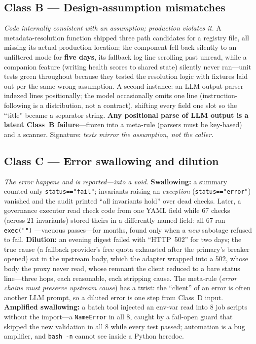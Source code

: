 \documentclass[conference]{IEEEtran}
\begin{document}
\subsection{Class B --- Design-assumption mismatches}
\emph{Code internally consistent with an assumption; production violates
it.} A metadata-resolution function shipped three path candidates for a
registry file, all missing its actual production location; the component
fell back silently to an unfiltered mode for \textbf{five days}, its
fallback log line scrolling past unread, while a companion feature
(writing health scores to shared state) silently never ran---unit tests
green throughout because they tested the resolution logic with fixtures
laid out per the same wrong assumption. A second instance: an LLM-output
parser indexed lines positionally; the model occasionally omits one line
(instruction-following is a distribution, not a contract), shifting every
field one slot so the ``title'' became a separator string. \textbf{Any
positional parse of LLM output is a latent Class~B failure}---frozen into
a meta-rule (parsers must be key-based) and a scanner. Signature:
\emph{tests mirror the assumption, not the caller.}

\subsection{Class C --- Error swallowing and dilution}
\emph{The error happens and is reported---into a void.} \textbf{Swallowing:}
a summary counted only \texttt{status=="fail"}; invariants raising an
\emph{exception} (\texttt{status=="error"}) vanished and the audit printed
``all invariants hold'' over dead checks. Later, a governance executor
read check code from one YAML field while 67 checks (across 21 invariants)
stored theirs in a differently named field: all 67 ran \texttt{exec("")}
---vacuous passes---for months, found only when a \emph{new} sabotage
refused to fail. \textbf{Dilution:} an evening digest failed with
``HTTP~502'' for two days; the true cause (a fallback provider's free
quota exhausted after the primary's breaker opened) sat in the upstream
body, which the adapter wrapped into a 502, whose body the proxy never
read, whose remnant the client reduced to a bare status line---three hops,
each reasonable, each stripping cause. The meta-rule (\emph{error chains
must preserve upstream cause}) has a twist: the ``client'' of an error is
often another LLM prompt, so a diluted error is one step from Class~D
input. \textbf{Amplified swallowing:} a batch tool injected an env-var
read into 8 job scripts without the import---a \texttt{NameError} in all
8, caught by a fail-open guard that skipped the new validation in all 8
while every test passed; automation is a bug amplifier, and
\texttt{bash~-n} cannot see inside a Python heredoc.
\end{document}
